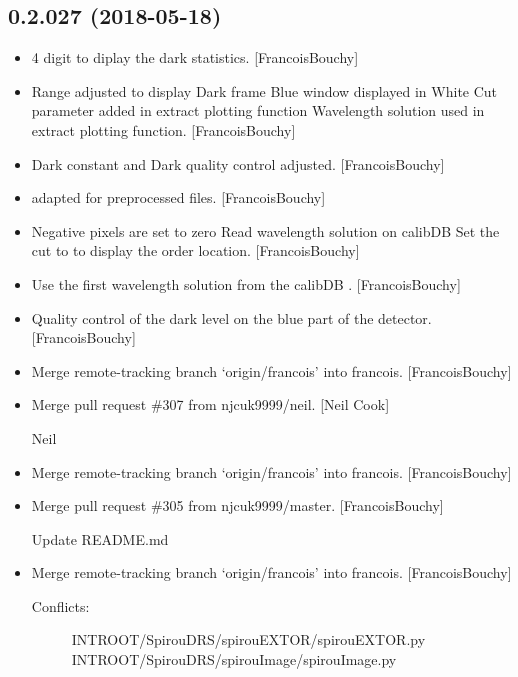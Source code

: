 \documentclass[a4paper,10pt,english]{report}
\begin{document}
\subsection{0.2.027 (2018-05-18)}
\label{\detokenize{misc/changelog:id434}}\begin{itemize}
\item {} 
4 digit to diplay the dark statistics. {[}FrancoisBouchy{]}

\item {} 
Range adjusted to display Dark frame Blue window displayed in White
Cut parameter added in extract plotting function Wavelength solution
used in extract plotting function. {[}FrancoisBouchy{]}

\item {} 
Dark constant and Dark quality control adjusted. {[}FrancoisBouchy{]}

\item {} 
 adapted for preprocessed files. {[}FrancoisBouchy{]}

\item {} 
Negative pixels are set to zero Read wavelength solution on calibDB
Set the cut to  to display the order location.
{[}FrancoisBouchy{]}

\item {} 
Use the first wavelength solution from the calibDB
. {[}FrancoisBouchy{]}

\item {} 
Quality control of the dark level on the blue part of the detector.
{[}FrancoisBouchy{]}

\item {} 
Merge remote-tracking branch ‘origin/francois’ into francois.
{[}FrancoisBouchy{]}

\item {} 
Merge pull request \#307 from njcuk9999/neil. {[}Neil Cook{]}

Neil

\item {} 
Merge remote-tracking branch ‘origin/francois’ into francois.
{[}FrancoisBouchy{]}

\item {} 
Merge pull request \#305 from njcuk9999/master. {[}FrancoisBouchy{]}

Update README.md

\item {} 
Merge remote-tracking branch ‘origin/francois’ into francois.
{[}FrancoisBouchy{]}
\begin{description}
\item[{Conflicts:}] \leavevmode
INTROOT/SpirouDRS/spirouEXTOR/spirouEXTOR.py
INTROOT/SpirouDRS/spirouImage/spirouImage.py

\end{description}

\end{itemize}
\end{document}
